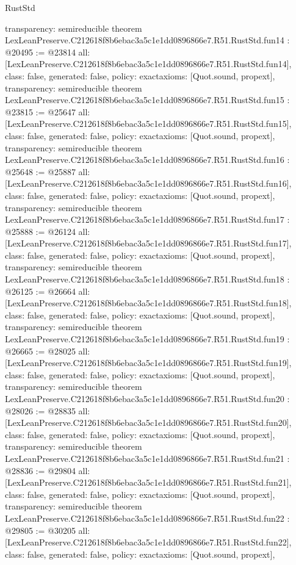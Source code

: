 \begin{lexlean}{RustStd}
\begin{coremodule}
{  transparency: semireducible
}
theorem LexLeanPreserve.C212618f8b6ebac3a5c1e1dd0896866e7.R51.RustStd.fun14 : @20495 := @23814 {
  all: [LexLeanPreserve.C212618f8b6ebac3a5c1e1dd0896866e7.R51.RustStd.fun14],
  class: false,
  generated: false,
  policy: exact{axioms: [Quot.sound, propext]},
  transparency: semireducible
}
theorem LexLeanPreserve.C212618f8b6ebac3a5c1e1dd0896866e7.R51.RustStd.fun15 : @23815 := @25647 {
  all: [LexLeanPreserve.C212618f8b6ebac3a5c1e1dd0896866e7.R51.RustStd.fun15],
  class: false,
  generated: false,
  policy: exact{axioms: [Quot.sound, propext]},
  transparency: semireducible
}
theorem LexLeanPreserve.C212618f8b6ebac3a5c1e1dd0896866e7.R51.RustStd.fun16 : @25648 := @25887 {
  all: [LexLeanPreserve.C212618f8b6ebac3a5c1e1dd0896866e7.R51.RustStd.fun16],
  class: false,
  generated: false,
  policy: exact{axioms: [Quot.sound, propext]},
  transparency: semireducible
}
theorem LexLeanPreserve.C212618f8b6ebac3a5c1e1dd0896866e7.R51.RustStd.fun17 : @25888 := @26124 {
  all: [LexLeanPreserve.C212618f8b6ebac3a5c1e1dd0896866e7.R51.RustStd.fun17],
  class: false,
  generated: false,
  policy: exact{axioms: [Quot.sound, propext]},
  transparency: semireducible
}
theorem LexLeanPreserve.C212618f8b6ebac3a5c1e1dd0896866e7.R51.RustStd.fun18 : @26125 := @26664 {
  all: [LexLeanPreserve.C212618f8b6ebac3a5c1e1dd0896866e7.R51.RustStd.fun18],
  class: false,
  generated: false,
  policy: exact{axioms: [Quot.sound, propext]},
  transparency: semireducible
}
theorem LexLeanPreserve.C212618f8b6ebac3a5c1e1dd0896866e7.R51.RustStd.fun19 : @26665 := @28025 {
  all: [LexLeanPreserve.C212618f8b6ebac3a5c1e1dd0896866e7.R51.RustStd.fun19],
  class: false,
  generated: false,
  policy: exact{axioms: [Quot.sound, propext]},
  transparency: semireducible
}
theorem LexLeanPreserve.C212618f8b6ebac3a5c1e1dd0896866e7.R51.RustStd.fun20 : @28026 := @28835 {
  all: [LexLeanPreserve.C212618f8b6ebac3a5c1e1dd0896866e7.R51.RustStd.fun20],
  class: false,
  generated: false,
  policy: exact{axioms: [Quot.sound, propext]},
  transparency: semireducible
}
theorem LexLeanPreserve.C212618f8b6ebac3a5c1e1dd0896866e7.R51.RustStd.fun21 : @28836 := @29804 {
  all: [LexLeanPreserve.C212618f8b6ebac3a5c1e1dd0896866e7.R51.RustStd.fun21],
  class: false,
  generated: false,
  policy: exact{axioms: [Quot.sound, propext]},
  transparency: semireducible
}
theorem LexLeanPreserve.C212618f8b6ebac3a5c1e1dd0896866e7.R51.RustStd.fun22 : @29805 := @30205 {
  all: [LexLeanPreserve.C212618f8b6ebac3a5c1e1dd0896866e7.R51.RustStd.fun22],
  class: false,
  generated: false,
  policy: exact{axioms: [Quot.sound, propext]},
}
\end{coremodule}
\end{lexlean}
